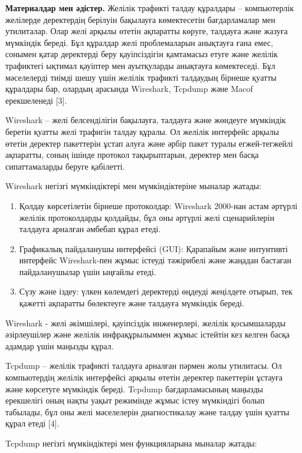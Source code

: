 \textbf{Материалдар мен әдістер.} Желілік трафикті талдау құралдары --
компьютерлік желілерде деректердің берілуін бақылауға көмектесетін
бағдарламалар мен утилиталар. Олар желі арқылы өтетін ақпаратты көруге,
талдауға және жазуға мүмкіндік береді. Бұл құралдар желі проблемаларын
анықтауға ғана емес, сонымен қатар деректерді беру қауіпсіздігін
қамтамасыз етуге және желілік трафиктегі ықтимал қауіптер мен
ауытқуларды анықтауға көмектеседі. Бұл мәселелерді тиімді шешу үшін
желілік трафикті талдаудың бірнеше қуатты құралдары бар, олардың
арасында Wireshark, Tcpdump және Macof ерекшеленеді {[}3{]}.

Wireshark -- желі белсенділігін бақылауға, талдауға және жөндеуге
мүмкіндік беретін қуатты желі трафигін талдау құралы. Ол желілік
интерфейс арқылы өтетін деректер пакеттерін ұстап алуға және әрбір пакет
туралы егжей-тегжейлі ақпаратты, соның ішінде протокол тақырыптарын,
деректер мен басқа сипаттамаларды беруге қабілетті.

Wireshark негізгі мүмкіндіктері мен мүмкіндіктеріне мыналар жатады:

\begin{enumerate}
\def\labelenumi{\arabic{enumi}.}
\item
  Қолдау көрсетілетін бірнеше протоколдар: Wireshark 2000-нан астам
  әртүрлі желілік протоколдарды қолдайды, бұл оны әртүрлі желі
  сценарийлерін талдауға арналған әмбебап құрал етеді.
\item
  Графикалық пайдаланушы интерфейсі (GUI): Қарапайым және интуитивті
  интерфейс Wireshark-пен жұмыс істеуді тәжірибелі және жаңадан бастаған
  пайдаланушылар үшін ыңғайлы етеді.
\item
  Сүзу және іздеу: үлкен көлемдегі деректерді өңдеуді жеңілдете отырып,
  тек қажетті ақпаратты бөлектеуге және талдауға мүмкіндік береді.
\end{enumerate}

Wireshark - желі әкімшілері, қауіпсіздік инженерлері, желілік
қосымшаларды әзірлеушілер және желілік инфрақұрылыммен жұмыс істейтін
кез келген басқа адамдар үшін маңызды құрал.

Tcpdump -- желілік трафикті талдауға арналған пәрмен жолы утилитасы. Ол
компьютердің желілік интерфейсі арқылы өтетін деректер пакеттерін
ұстауға және көрсетуге мүмкіндік береді. Tcpdump бағдарламасының маңызды
ерекшелігі оның нақты уақыт режимінде жұмыс істеу мүмкіндігі болып
табылады, бұл оны желі мәселелерін диагностикалау және талдау үшін
қуатты құрал етеді {[}4{]}.

Tcpdump негізгі мүмкіндіктері мен функцияларына мыналар жатады:


